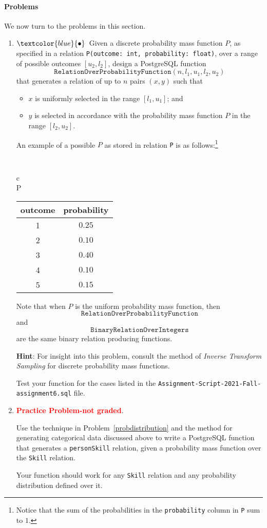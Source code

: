 \documentclass{article}
\newcommand{\bluebullet}{$\textcolor{blue}{\bullet}$}
\begin{document}
\paragraph{Problems}
We now turn to the problems in this section.
\begin{enumerate}[resume]
\item\label{probdistribution}\bluebullet\  Given a discrete probability mass function $P$, as specified in a relation {\tt P(outcome: int, probability: float)}, over a range of possible outcomes $[u_2,l_2]$, design a PostgreSQL function 
\[\mathtt{RelationOverProbabilityFunction}(n,l_1,u_1,l_2,u_2)\] that generates a relation of up to $n$ pairs $(x,y)$ such that
\begin{itemize}
\item  $x$ is uniformly selected in the range $[l_1,u_1]$; and
\item  $y$ is selected in accordance with the probability mass function $P$ in the range $[l_2,u_2]$.
\end{itemize}

An example of a possible $P$ as stored in relation {\tt P} is as follows:\footnote{Notice that the sum of the probabilities in the {\tt probability} column in {\tt P} sum to $1$.}
\begin{center}
{\tt 
\begin{tabular}{c} \\
P \\
\begin{tabular}{cc}
outcome & probability \\ \hline
1 & $0.25$ \\ 
2 & $0.10$ \\
3 & $0.40$ \\
4 & $0.10$ \\
5 & $0.15$ \\
\end{tabular}
\end{tabular}
}
\end{center}

Note that when $P$ is the uniform probability mass function, then
\[\mathtt{RelationOverProbabilityFunction}\]
and
\[\mathtt{BinaryRelationOverIntegers}\] are the same binary relation producing functions.

{\bf Hint}:  For insight into this problem, consult the method of 
\emph{Inverse Transform Sampling} for discrete probability mass functions.

Test your function for the cases listed in the {\tt Assignment-Script-2021-Fall-assignment6.sql} file.

\item \textcolor{red}{\bf Practice Problem-not graded}.

Use the technique in Problem~\ref{probdistribution} and the method for generating categorical data discussed above to
write a PostgreSQL function that generates a {\tt personSkill} relation, given a probability mass function over the {\tt Skill} relation.   

Your function should work for any {\tt Skill} relation and any probability distribution defined over it.
\end{enumerate}
\end{document}
